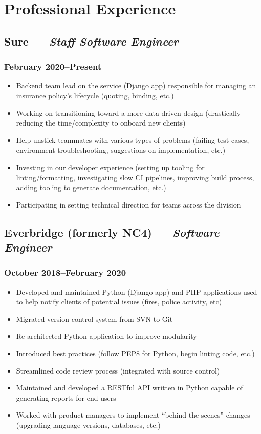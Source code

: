 \documentclass{article}
\begin{document}
\begin{minipage}[t]{.6\textwidth}
	\section*{Professional Experience}
	\subsection*{Sure  --- \textit{Staff Software Engineer}}
	\subsubsection*{February 2020--Present}
	\begin{itemize}
		\item Backend team lead on the service (Django app) responsible for
		      managing an insurance policy's lifecycle (quoting, binding, etc.)
		\item Working on transitioning toward a more data-driven design
		      (drastically reducing the time/complexity to onboard new clients)
		\item Help unstick teammates with various types of problems (failing test cases,
		      environment troubleshooting, suggestions on implementation, etc.)
		\item Investing in our developer experience (setting up tooling for
		      linting/formatting, investigating slow CI pipelines, improving
		      build
		      process, adding tooling to generate documentation, etc.)
		\item Participating in setting technical direction for teams across the
		      division
	\end{itemize}
	\subsection*{Everbridge (formerly NC4) --- \textit{Software Engineer}}
	\subsubsection*{October 2018--February 2020}
	\begin{itemize}
		\item Developed and maintained Python (Django app) and PHP applications
		      used to help notify clients of potential issues (fires, police
		      activity, etc)
		\item Migrated version control system from SVN to Git
		\item Re-architected Python application to improve modularity
		\item Introduced best practices (follow PEP8 for Python, begin linting code, etc.)
		\item Streamlined code review process (integrated with source control)
		\item Maintained and developed a RESTful API written in Python capable of generating
		      reports for end users
		\item Worked with product managers to implement ``behind the scenes'' changes
		      (upgrading language versions, databases, etc.)
	\end{itemize}

\end{minipage}
\end{document}

